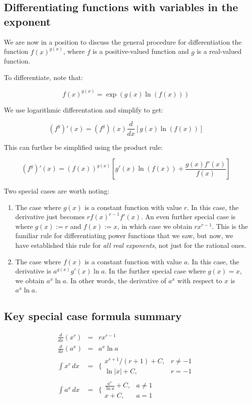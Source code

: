 \documentclass[10pt]{amsart}
\begin{document}
\subsection{Differentiating functions with variables in the exponent}

We are now in a position to discuss the general procedure for
differentiation the function $f(x)^{g(x)}$, where $f$ is a
positive-valued function and $g$ is a real-valued function.

To differentiate, note that:

$$f(x)^{g(x)} = \exp(g(x) \ln(f(x)))$$

We use logarithmic differentation and simplify to get:

$$(f^g)'(x) = (f^g)(x) \frac{d}{dx}[g(x) \ln(f(x))]$$

This can further be simplified using the product rule:

$$(f^g)'(x) = (f(x))^{g(x)}\left[g'(x) \ln(f(x)) + \frac{g(x)f'(x)}{f(x)}\right]$$

Two special cases are worth noting:

\begin{enumerate}
\item The case where $g(x)$ is a constant function with value $r$. In
  this case, the derivative just becomes $rf(x)^{r-1}f'(x)$. An even
  further special case is where $g(x) := r$ and $f(x) := x$, in which
  case we obtain $rx^{r-1}$. This is the familiar rule for
  differentiating power functions that we saw, but now, we have
  established this rule for {\em all real exponents}, not just for the
  rational ones.
\item The case where $f(x)$ is a constant function with value $a$. In
  this case, the derivative is $a^{g(x)}g'(x) \ln a$. In the further
  special case where $g(x) = x$, we obtain $a^x \ln a$. In other
  words, the derivative of $a^x$ with respect to $x$ is $a^x \ln a$.
\end{enumerate}

\subsection{Key special case formula summary}

\begin{eqnarray*}
  \frac{d}{dx}(x^r) & = & rx^{r-1}\\
  \frac{d}{dx}(a^x) & = & a^x \ln a \\
  \int x^r \, dx & = & \lbrace\begin{array}{ll} x^{r+1}/(r + 1) + C, & r \ne -1 \\ \ln |x| + C, & r = -1 \end{array}\\
  \int a^x \, dx & = & \lbrace\begin{array}{ll} \frac{a^x}{\ln a} + C, & a \ne 1 \\ x + C, & a = 1 \end{array}
\end{eqnarray*}
\end{document}

